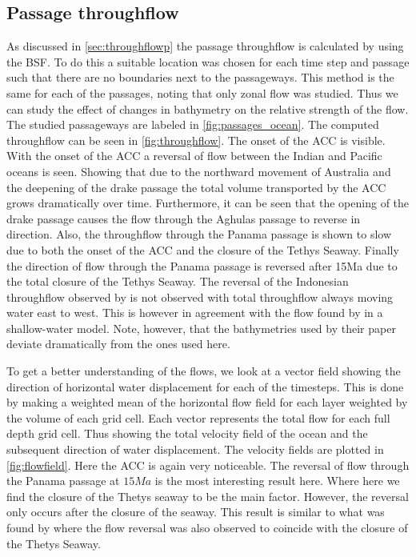 \subsection{Passage throughflow} \label{sec:throughflow}
As discussed in \cref{sec:throughflowp} the passage throughflow is calculated by using the BSF. To do this a suitable location was chosen for each time step and passage such that there are no boundaries next to the passageways. This method is the same for each of the passages, noting that only zonal flow was studied. Thus we can study the effect of changes in bathymetry on the relative strength of the flow.  The studied passageways are labeled in \cref{fig:passages_ocean}. The computed throughflow can be seen in \cref{fig:throughflow}. The onset of the ACC is visible. With the onset of the ACC a reversal of flow between the Indian and Pacific oceans is seen. Showing that due to the northward movement of Australia and the deepening of the drake passage the total volume transported by the ACC grows dramatically over time. Furthermore, it can be seen that the opening of the drake passage causes the flow through the Aghulas passage to reverse in direction. Also, the throughflow through the Panama passage is shown to slow due to both the onset of the ACC and the closure of the Tethys Seaway. Finally the direction of flow through the Panama passage is reversed after 15Ma due to the total closure of the Tethys Seaway. The reversal of the Indonesian throughflow observed by \cite{Mulder2017Jul} is not observed with total throughflow always moving water east to west. This is however in agreement with the flow found by \cite{omta2003physical} in a shallow-water model. Note, however, that the bathymetries used by their paper deviate dramatically from the ones used here.


To get a better understanding of the flows, we look at a vector field showing the direction of horizontal water displacement for each of the timesteps. This is done by making a weighted mean of the horizontal flow field for each layer weighted by the volume of each grid cell. Each vector represents the total flow for each full depth grid cell. Thus showing the total velocity field of the ocean and the subsequent direction of water displacement. The velocity fields are plotted in  \cref{fig:flowfield}. Here the ACC is again very noticeable. The reversal of flow through the Panama passage at $15Ma$ is the most interesting result here.  Where here we find the closure of the Thetys seaway to be the main factor. However, the reversal only occurs after the closure of the seaway. This result is similar to what was found by \cite{omta2003physical} where the flow reversal was also observed to coincide with the closure of the Thetys Seaway.

